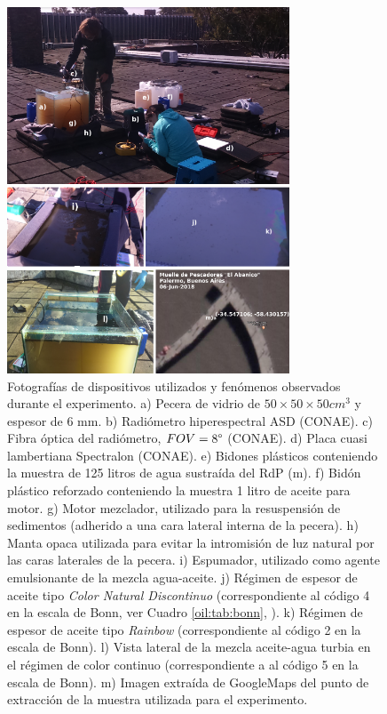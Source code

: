     \begin{figure}
    \centering
    \includegraphics[width=0.75\textwidth]{oil/figures/fotos}
    \caption[Fotografías de dispositivos utilizados y fenómenos observados durante el experimento de detección de hidrocarburos.]{Fotografías de dispositivos utilizados y fenómenos observados durante el experimento. a) Pecera de vidrio de $50 \times 50 \times 50 cm^{3}$ y espesor de 6 mm. b) Radiómetro hiperespectral ASD (CONAE). c) Fibra óptica del radiómetro, $FOV = 8\degree$ (CONAE). d) Placa cuasi lambertiana Spectralon (CONAE). e) Bidones plásticos conteniendo la muestra de 125 litros de agua sustraída del RdP (m). f) Bidón plástico reforzado conteniendo la muestra 1 litro de aceite para motor. g) Motor mezclador, utilizado para la resuspensión de sedimentos (adherido a una cara lateral interna de la pecera). h) Manta opaca utilizada para evitar la intromisión de luz natural por las caras laterales de la pecera. i) Espumador, utilizado como agente emulsionante de la mezcla agua-aceite. j) Régimen de espesor de aceite tipo \textit{Color Natural Discontinuo} (correspondiente al código 4 en la escala de Bonn, ver Cuadro \ref{oil:tab:bonn}, \cite{bonn2004}). k) Régimen de espesor de aceite tipo \textit{Rainbow} (correspondiente al código 2 en la escala de Bonn). l) Vista lateral de la mezcla aceite-agua turbia en el régimen de color continuo (correspondiente a al código 5 en la escala de Bonn). m) Imagen extraída de GoogleMaps del punto de extracción de la muestra utilizada para el experimento.}
    \label{oil:fotos}
    \end{figure}
    
